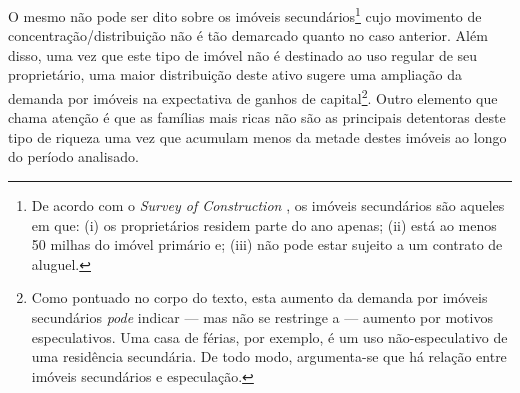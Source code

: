 O mesmo não pode ser dito sobre os imóveis secundários\footnote{
	De acordo com o \textit{Survey of Construction} \cite{us_census_bureau_characteristics_2017}, os imóveis secundários são aqueles em que: (i) os proprietários residem parte do ano apenas; (ii) está ao menos 50 milhas do imóvel primário e; (iii) não pode estar sujeito a um contrato de aluguel.
} cujo movimento de concentração/distribuição não é tão demarcado quanto no caso anterior.
Além disso, uma vez que este tipo de imóvel não é destinado ao uso regular de seu proprietário, uma maior distribuição deste ativo sugere uma ampliação da demanda por imóveis na expectativa de ganhos de capital\footnote{
	Como pontuado no corpo do texto, esta aumento da demanda por imóveis secundários \textit{pode} indicar --- mas não se restringe a --- aumento por motivos especulativos. Uma casa de férias, por exemplo, é um uso não-especulativo de uma residência secundária.
	De todo modo, argumenta-se que há relação entre imóveis secundários e especulação.
}.
Outro elemento que chama atenção é que as famílias mais ricas não são as principais detentoras deste tipo de riqueza uma vez que acumulam menos da metade destes imóveis ao longo do período analisado.




